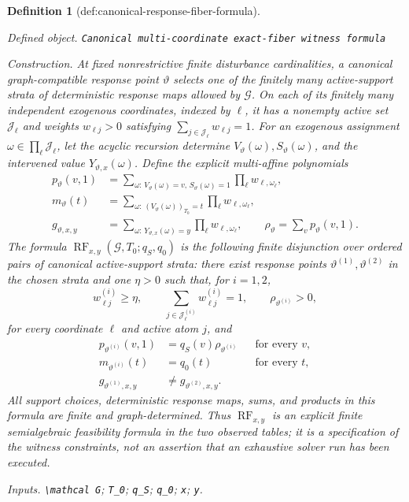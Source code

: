 \documentclass{article}
\newtheorem{definition}{Definition}
\begin{document}
\begin{definition}[def:canonical-response-fiber-formula]\label{def:canonical-response-fiber-formula}
\par\smallskip\noindent\emph{Defined object.} \texttt{Canonical multi-\allowbreak{}coordinate exact-\allowbreak{}fiber witness formula}
\par\smallskip\noindent\emph{Construction.} At fixed nonrestrictive finite disturbance cardinalities, a canonical graph-compatible response point \(\vartheta\) selects one of the finitely many active-support strata of deterministic response maps allowed by \(\mathcal G\).  On each of its finitely many independent exogenous coordinates, indexed by \(\ell\), it has a nonempty active set \(\mathcal J_\ell\) and weights \(w_{\ell j}>0\) satisfying \(\sum_{j\in\mathcal J_\ell}w_{\ell j}=1\).  For an exogenous assignment \(\omega\in\prod_\ell\mathcal J_\ell\), let the acyclic recursion determine \(V_\vartheta(\omega),S_\vartheta(\omega)\), and the intervened value \(Y_{\vartheta,x}(\omega)\).  Define the explicit multi-affine polynomials
\[
 \begin{aligned}
 p_\vartheta(v,1)
 &=\sum_{\omega:\,V_\vartheta(\omega)=v,\,S_\vartheta(\omega)=1}
      \prod_\ell w_{\ell,\omega_\ell},\\
 m_\vartheta(t)
 &=\sum_{\omega:\,(V_\vartheta(\omega))_{T_0}=t}
      \prod_\ell w_{\ell,\omega_\ell},\\
 g_{\vartheta,x,y}
 &=\sum_{\omega:\,Y_{\vartheta,x}(\omega)=y}
      \prod_\ell w_{\ell,\omega_\ell},
 \qquad
 \rho_\vartheta=\sum_vp_\vartheta(v,1).
 \end{aligned}
\]
The formula \(\operatorname{RF}_{x,y}(\mathcal G,T_0;q_S,q_0)\) is the following finite disjunction over ordered pairs of canonical active-support strata: there exist response points \(\vartheta^{(1)},\vartheta^{(2)}\) in the chosen strata and one \(\eta>0\) such that, for \(i=1,2\),
\[
 w^{(i)}_{\ell j}\geq\eta,\qquad
 \sum_{j\in\mathcal J^{(i)}_\ell}w^{(i)}_{\ell j}=1,\qquad
 \rho_{\vartheta^{(i)}}>0,
\]
for every coordinate \(\ell\) and active atom \(j\), and
\[
 \begin{aligned}
 p_{\vartheta^{(i)}}(v,1)&=q_S(v)\rho_{\vartheta^{(i)}}
 &&\text{for every }v,\\
 m_{\vartheta^{(i)}}(t)&=q_0(t)
 &&\text{for every }t,\\
 g_{\vartheta^{(1)},x,y}&\neq g_{\vartheta^{(2)},x,y}.&&
 \end{aligned}
\]
All support choices, deterministic response maps, sums, and products in this formula are finite and graph-determined.  Thus \(\operatorname{RF}_{x,y}\) is an explicit finite semialgebraic feasibility formula in the two observed tables; it is a specification of the witness constraints, not an assertion that an exhaustive solver run has been executed.
\par\smallskip\noindent\emph{Inputs.} \texttt{\textbackslash{}\allowbreak{}mathcal G}; \texttt{T\_\allowbreak{}0}; \texttt{q\_\allowbreak{}S}; \texttt{q\_\allowbreak{}0}; \texttt{x}; \texttt{y}.
\end{definition}
\end{document}
